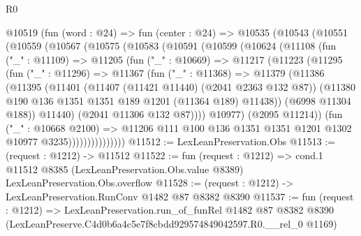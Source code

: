 \begin{lexlean}{R0}
\begin{coremodule}
      @10519
        (fun (word : @24) =>
        fun (center : @24) =>
        @10535
          (@10543
            (@10551
              (@10559
                (@10567
                  (@10575
                    (@10583
                      (@10591
                        (@10599
                          (@10624
                            (@11108
                              (fun ("_" : @11109) =>
                              @11205
                                (fun ("_" : @10669) =>
                                @11217
                                  (@11223
                                    (@11295
                                      (fun ("_" : @11296) =>
                                      @11367
                                        (fun ("_" : @11368) =>
                                        @11379
                                          (@11386
                                            (@11395
                                              (@11401
                                                (@11407 (@11421 @11440) (@2041 @2363 @132 @87))
                                                (@11380
                                                  @190
                                                  @136
                                                  @1351
                                                  @1351
                                                  @189
                                                  @1201
                                                  (@11364 @189)
                                                  @11438))
                                              (@6998 @11304 @188))
                                            @11440)
                                          (@2041 @11306 @132 @87))))
                                    @10977)
                                  (@2095 @11214))
                                (fun ("_" : @10668 @2100) =>
                                @11206
                                  @111
                                  @100
                                  @136
                                  @1351
                                  @1351
                                  @1201
                                  @1302
                                  @10977
                                  @3235)))))))))))))))
@11512 := LexLeanPreservation.Obs
@11513 := (request : @1212) -> @11512
@11522 := fun (request : @1212) =>
  cond.{1} @11512 @8385 (LexLeanPreservation.Obs.value @8389) LexLeanPreservation.Obs.overflow
@11528 := (request : @1212) -> LexLeanPreservation.RunConv @1482 @87 @8382 @8390
@11537 := fun (request : @1212) =>
  LexLeanPreservation.run_of_funRel
    @1482
    @87
    @8382
    @8390
    (LexLeanPreserve.C4d0b6a4c5e7f8cbdd929574849042597.R0.__rel_0 @1169)
\end{coremodule}
\end{lexlean}
